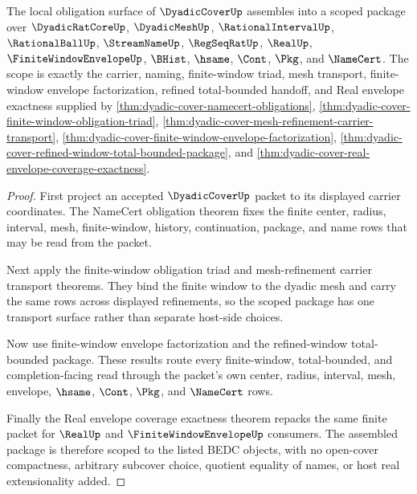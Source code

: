 \begin{theorem}
\label{thm:dyadic-cover-scoped-package}
The local obligation surface of $\DyadicCoverUp$ assembles into a scoped
package over $\DyadicRatCoreUp$, $\DyadicMeshUp$, $\RationalIntervalUp$,
$\RationalBallUp$, $\StreamNameUp$, $\RegSeqRatUp$, $\RealUp$,
$\FiniteWindowEnvelopeUp$, $\BHist$, $\hsame$, $\Cont$, $\Pkg$, and
$\NameCert$. The scope is exactly the carrier, naming, finite-window triad,
mesh transport, finite-window envelope factorization, refined total-bounded
handoff, and Real envelope exactness supplied by
\autoref{thm:dyadic-cover-namecert-obligations},
\autoref{thm:dyadic-cover-finite-window-obligation-triad},
\autoref{thm:dyadic-cover-mesh-refinement-carrier-transport},
\autoref{thm:dyadic-cover-finite-window-envelope-factorization},
\autoref{thm:dyadic-cover-refined-window-total-bounded-package}, and
\autoref{thm:dyadic-cover-real-envelope-coverage-exactness}.
\end{theorem}
\begin{proof}
First project an accepted $\DyadicCoverUp$ packet to its displayed carrier
coordinates. The NameCert obligation theorem fixes the finite center,
radius, interval, mesh, finite-window, history, continuation, package, and
name rows that may be read from the packet.

Next apply the finite-window obligation triad and mesh-refinement carrier
transport theorems. They bind the finite window to the dyadic mesh and carry
the same rows across displayed refinements, so the scoped package has one
transport surface rather than separate host-side choices.

Now use finite-window envelope factorization and the refined-window
total-bounded package. These results route every finite-window,
total-bounded, and completion-facing read through the packet's own center,
radius, interval, mesh, envelope, $\hsame$, $\Cont$, $\Pkg$, and $\NameCert$
rows.

Finally the Real envelope coverage exactness theorem repacks the same finite
packet for $\RealUp$ and $\FiniteWindowEnvelopeUp$ consumers. The assembled
package is therefore scoped to the listed BEDC objects, with no open-cover
compactness, arbitrary subcover choice, quotient equality of names, or host
real extensionality added.
\end{proof}

